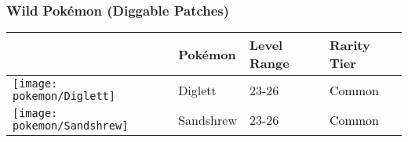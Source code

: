 \subsubsection{Wild Pokémon (Diggable Patches)}%
\label{ssubsec:WildPokmon(DiggablePatches)}%
\begin{longtable}{||l l l l||}%
\hline%
&Pokémon&Level Range&Rarity Tier\\%
\hline%
\endhead%
\hline%
\texttt{[image: pokemon/Diglett]}&Diglett&23{-}26&\textcolor{black}{%
Common%
}\\%
\hline%
\texttt{[image: pokemon/Sandshrew]}&Sandshrew&23{-}26&\textcolor{black}{%
Common%
}\\%
\hline%
\end{longtable}%
\caption{Wild Pokemon in Route 209 (Diggable Patches)}